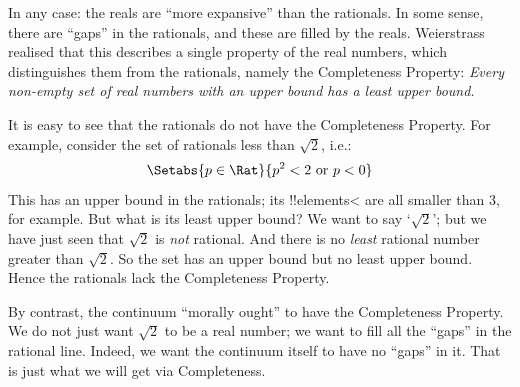 \documentclass[../../../include/open-logic-section]{subfiles}
\begin{document}
In any case: the reals are ``more expansive'' than the rationals. In some sense, there are ``gaps'' in the rationals, and these are filled by the reals. Weierstrass realised that this describes a single property of the real numbers, which distinguishes them from the rationals, namely the Completeness Property: \emph{Every non-empty set of real numbers with an upper bound has a least upper bound.} 

It is easy to see that the rationals do not have the Completeness Property. For example, consider the set of rationals less than $\sqrt{2}$, i.e.:
\[
	\Setabs{p \in \Rat}{p^2 < 2 \text{ or }p < 0}
\]
This has an upper bound in the rationals; its !!{element}s< are all  smaller than $3$, for example. But what is its least upper bound? We want to say `$\sqrt{2}$'; but we have just seen that $\sqrt{2}$ is \emph{not} rational. And there is no \emph{least} rational number greater than $\sqrt{2}$. So the set has an upper bound but no least upper bound. Hence the rationals lack the Completeness Property.

By contrast, the continuum ``morally ought'' to have the Completeness Property. We do not just want $\sqrt{2}$ to be a real number; we want to fill all the ``gaps'' in the rational line. Indeed, we want the continuum itself to have no ``gaps'' in it. That is just what we will get via Completeness.
\end{document}
